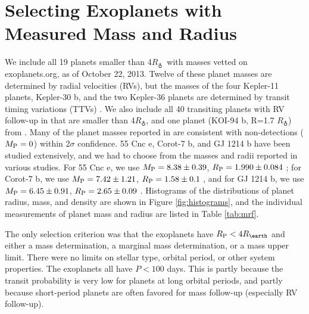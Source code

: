 \documentclass[iop]{emulateapj}
\newcommand{\rpl}{\ensuremath{R_{\rm P}}}
\newcommand{\mpl}{\ensuremath{M_{\rm P}}}
\newcommand{\rearth}{\ensuremath{R_\earth}}
\begin{document}
\section{Selecting Exoplanets with Measured Mass and Radius}
We include all 19 planets smaller than 4\rearth\ with masses vetted on exoplanets.org, as of October 22, 2013.  Twelve of these planet masses are determined by radial velocities (RVs), but the masses of the four Kepler-11 planets, Kepler-30 b, and the two Kepler-36 planets are determined by transit timing variations (TTVs) \citep{Lissauer2013, Sanchis-Ojeda2012, Carter2012}. We also include all 40 transiting planets with RV follow-up in \citet{Marcy2013} that are smaller than 4\rearth, and one planet (KOI-94 b, R=1.7 \rearth) from \citet{Weiss2013}.  Many of the planet masses reported in \citet{Marcy2013} are consistent with non-detections ($\mpl=0$) within $2\sigma$ confidence.  55 Cnc e, Corot-7 b, and GJ 1214 b have been studied extensively, and we had to choose from the masses and radii reported in various studies.  For 55 Cnc e, we use $\mpl = 8.38\pm0.39$, $\rpl = 1.990\pm0.084$ \citep{Endl2012,Dragomir2013}; for Corot-7 b, we use $\mpl =7.42\pm1.21$, $\rpl= 1.58\pm 0.1$ \citep{Hatzes2011}, and for GJ 1214 b, we use $\mpl =6.45\pm0.91 $, $\rpl= 2.65\pm0.09$ \citep{Carter2011}.  Histograms of the distributions of planet radius, mass, and density are shown in Figure \ref{fig:histograms}, and the individual measurements of planet mass and radius are listed in Table \ref{tab:mrf}.

The only selection criterion was that the exoplanets have $\rpl < 4 \rearth$ and either a mass determination, a marginal mass determination, or a mass upper limit.  There were no limits on stellar type, orbital period, or other system properties.  The exoplanets all have $P < 100$ days.  This is partly because the transit probability is very low for planets at long orbital periods, and partly because short-period planets are often favored for mass follow-up (especially RV follow-up).
\end{document}
